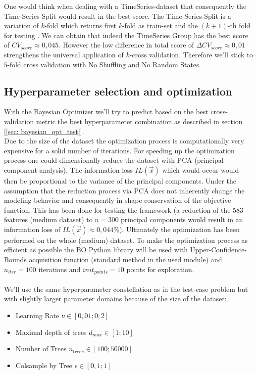 \documentclass[12pt, a4paper]{article}
\begin{document}
One would think when dealing with a TimeSeries-dataset that consequently the Time-Series-Split would result in the best score. The Time-Series-Split is a variation of $k$-fold which returns first $k$-fold as train-set and the $(k + 1)$-th fold for testing \cite{Scikit2023}. We can obtain that indeed the TimeSeries Group has the best score of $CV_{score} \approx 0{,}045$. However the low difference in total score of $\Delta CV_{score} \approx 0{,}01$ strengthens the universal application of $k$-cross validation. Therefore we'll stick to $5$-fold cross validation with No Shuffling and No Random States.
\subsection{Hyperparameter selection and optimization}
\label{sec: bayesian_opt_numerai}
With the Bayesian Optimizer we'll try to predict based on the best cross-validation metric the best hyperparameter combination as described in section [\ref{sec: bayesian_opt_test}]. \\
Due to the size of the dataset the optimization process is computationally very expensive for a solid number of iterations.
For speeding up the optimization process one could dimensionally reduce the dataset with PCA (principal component analysis). The information loss $IL(\vec{x})$ which would occur would then be proportional to the variance of the principal components.
Under the assumption that the reduction process via PCA does not inherently change the modeling behavior and consequently in shape conservation of the objective function. This has been done for testing the framework (a reduction of the 583 features (medium dataset) to $n = 300$ principal components would result in an information loss of $IL(\vec{x}) \approx 0{,}044 \%$). Ultimately the optimization has been performed on the whole (medium) dataset.
To make the optimization process as efficient as possible the BO Python library \cite{Nogueira2014} will be used with Upper-Confidence-Bounds acquisition function (standard method in the used module) and $n_{iter} = 100$ iterations and $init_{points} = 10$ points for exploration. \\
\\
We'll use the same hyperparameter constellation as in the test-case problem but with slightly larger parameter domains because of the size of the dataset:
\begin{itemize}
    \item Learning Rate $\nu \in  [0{,}01 ; 0{,}2]$
    \item Maximal depth of trees $d_{max} \in [1; 10]$
    \item Number of Trees $n_{trees} \in [100; 50000]$
    \item Colsample by Tree $\epsilon \in [0{,}1; 1]$
\end{itemize}
\end{document}
